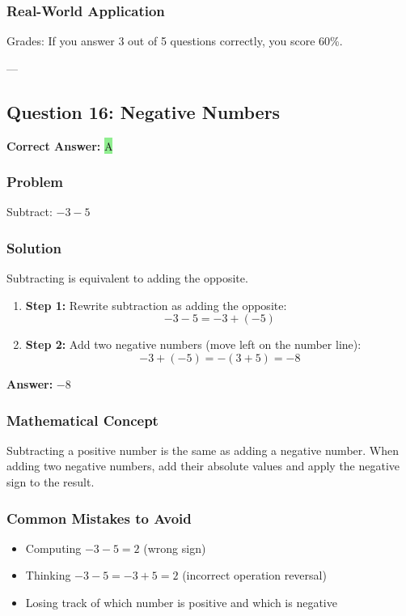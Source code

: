\documentclass[12pt]{article}
\begin{document}
\subsubsection*{Real-World Application}
Grades: If you answer 3 out of 5 questions correctly, you score 60\%.

---

\subsection{Question 16: Negative Numbers}

\textbf{Correct Answer: } \colorbox{lightgreen}{A}

\subsubsection*{Problem}
Subtract: $-3 - 5$

\subsubsection*{Solution}

Subtracting is equivalent to adding the opposite.

\begin{enumerate}
\item \textbf{Step 1:} Rewrite subtraction as adding the opposite:
  \[
  -3 - 5 = -3 + (-5)
  \]
\item \textbf{Step 2:} Add two negative numbers (move left on the number line):
  \[
  -3 + (-5) = -(3 + 5) = -8
  \]
\end{enumerate}

\textbf{Answer: } $-8$

\subsubsection*{Mathematical Concept}
Subtracting a positive number is the same as adding a negative number. When adding two negative numbers, add their absolute values and apply the negative sign to the result.

\subsubsection*{Common Mistakes to Avoid}
\begin{itemize}
\item Computing $-3 - 5 = 2$ (wrong sign)
\item Thinking $-3 - 5 = -3 + 5 = 2$ (incorrect operation reversal)
\item Losing track of which number is positive and which is negative
\end{itemize}
\end{document}
